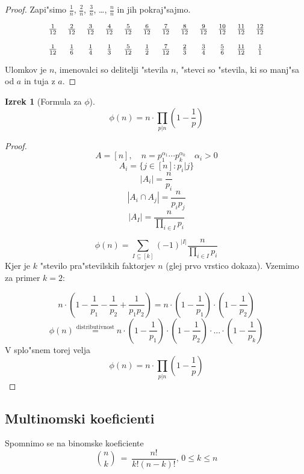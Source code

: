 \documentclass[a4paper,12pt]{article}
\theoremstyle{definition}
\newtheorem{theorem}[counter]{Izrek}
\theoremstyle{remark}
\begin{document}
\begin{proof}
	Zapi"simo $\frac{1}{n}$, $\frac{2}{n}$, $\frac{3}{n}$, \ldots, $\frac{n}{n}$ in jih pokraj"sajmo.

	\[
	\begin{tabular}{c c c c c c c c c c c c}

	$\frac{1}{12}$ & $\frac{2}{12}$ & $\frac{3}{12}$ & $\frac{4}{12}$ & $\frac{5}{12}$ & $\frac{6}{12}$ & $\frac{7}{12}$ & $\frac{8}{12}$ & $\frac{9}{12}$ & $\frac{10}{12}$ & $\frac{11}{12}$ & $\frac{12}{12}$\\
	\\
	$\frac{1}{12}$ & $\frac{1}{6}$ & $\frac{1}{4}$ & $\frac{1}{3}$ & $\frac{5}{12}$ & $\frac{1}{2}$ & $\frac{7}{12}$ & $\frac{2}{3}$ & $\frac{3}{4}$ & $\frac{5}{6}$ & $\frac{11}{12}$ & $\frac{1}{1}$

	\end{tabular}
	\]

	Ulomkov je $n$, imenovalci so delitelji "stevila $n$, "stevci so "stevila, ki so manj"sa od $a$ in tuja z $a$.
\end{proof}

\begin{theorem}[Formula za $\phi$]
	\[\phi (n) = n \cdot \prod_{p | n} (1 - \frac{1}{p})\]
\end{theorem}
\begin{proof}
	\[A = [n], \quad n = p_1^{\alpha_1} \cdots p_k^{\alpha_k} \quad \alpha_i > 0\]
	\[A_i = \{j \in [n] : p_i | j\} \]
	\[|A_i| = \frac{n}{p_i}\]
	\[|A_i \cap A_j| = \frac{n}{p_i p_j}\]
	\[|A_I| = \frac{n}{\displaystyle \prod_{i \in I} p_i}\]

	\[\phi (n) = \sum_{I \subseteq [k]} (-1)^{|I|} \frac{n}{\displaystyle \prod_{i \in I} p_i}\]
	Kjer je $k$ "stevilo pra"stevilskih faktorjev $n$ (glej prvo vrstico dokaza). Vzemimo za primer $k = 2$:

	\[n\cdot(1 - \frac{1}{p_1} - \frac{1}{p_2} + \frac{1}{p_1 p_2}) = n\cdot(1 - \frac{1}{p_1})\cdot(1 - \frac{1}{p_2})\]
	\[\phi (n) \stackrel{\text{distributivnost}}{=}  n\cdot(1 - \frac{1}{p_1})\cdot(1 - \frac{1}{p_2})\cdot \ldots \cdot(1 - \frac{1}{p_k})\]
	V splo"snem torej velja
	\[\phi (n) = n \cdot \prod_{p | n} (1 - \frac{1}{p})\]
\end{proof}

\subsection{Multinomski koeficienti}
Spomnimo se na binomske koeficiente
\[\binom{n}{k} \ = \ \frac{n!}{k! (n - k)!}\text{, } 0 \leqslant k \leqslant n\]
\end{document}
